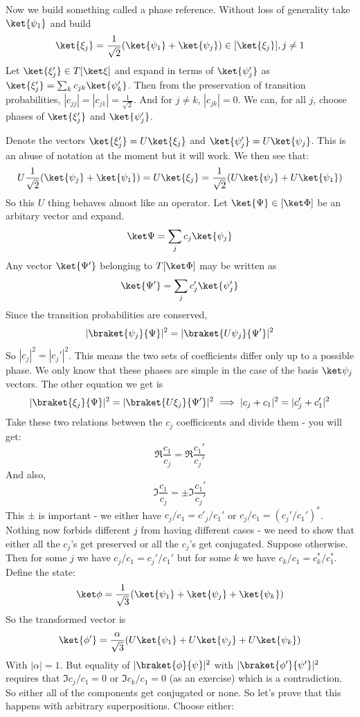 \documentclass{article}
\begin{document}
Now we build something called a phase reference. Without loss of generality take $\ket{\psi_1}$ and build 
\[\ket{\xi_j} = \frac{1}{\sqrt{2}}(\ket{\psi_1} + \ket{\psi_j}) \in [\ket{\xi_j}], j \neq 1\]
Let $\ket{\xi_j'} \in T[\ket\xi]$ and expand in terms of $\ket{\psi_j'}$ as $\ket{\xi_j'} = \sum_k c_{jk}\ket{\psi'_k}$. Then from the preservation of transition probabilities, $|c_{jj}|=|c_{j1}| = \frac{1}{\sqrt{2}}$. And for $j\neq k$, $|c_{jk}|=0$. We can, for all $j$, choose phases of $\ket{\xi_j'}$ and $\ket{\psi_j'}$.

Denote the vectors $\ket{\xi_j'} = U\ket{\xi_j}$ and $\ket{\psi_j'} = U\ket{\psi_j}$. This is an abuse of notation at the moment but it will work. We then see that:
\[U\frac{1}{\sqrt{2}}(\ket{\psi_j}+\ket{\psi_1}) = U\ket{\xi_j} = \frac{1}{\sqrt{2}}(U\ket{\psi_j}+U\ket{\psi_1})\]
So this $U$ thing behaves almost like an operator. Let $\ket{\Psi} \in [\ket\Phi]$ be an arbitary vector and expand.
\[\ket\Psi = \sum_j c_j \ket{\psi_j}\]
Any vector $\ket{\Psi'}$ belonging to $T[\ket\Phi]$ may be written as
\[\ket{\Psi'} = \sum_j c_j' \ket{\psi_j'}\]
Since the transition probabilities are conserved,
\[|\braket{\psi_j}{\Psi}|^2 = |\braket{U\psi_j}{\Psi'}|^2\]
So $|c_j|^2 = |c_j'|^2$. This means the two sets of coefficients differ only up to a possible phase. We only know that these phases are simple in the case of the basis $\ket\psi_j$ vectors. The other equation we get is
\[|\braket{\xi_j}{\Psi}|^2 = |\braket{U\xi_j}{\Psi'}|^2 \implies |c_j+c_1|^2 = |c_j'+c_1'|^2\]
Take these two relations between the $c_j$ coefficicents and divide them - you will get:
\[\Re\frac{c_1}{c_j} = \Re \frac{c_1'}{c_j'}\]
And also,
\[\Im\frac{c_1}{c_j} = \pm \Im \frac{c_1'}{c_j'}\]
This $\pm$ is important - we either have $c_j/c_1 = c'_j/c_1'$ or $c_j/c_1 = (c_j'/c_1')^*$. Nothing now forbids different $j$ from having different cases - we need to show that either all the $c_j$'s get preserved or all the $c_j$'s get conjugated. Suppose otherwise. Then for some $j$ we have $c_j/c_1 = c_j'/c_1'$ but for some $k$ we have $c_k/c_1 = c_k^*/c_1^*$. Define the state:
\[\ket\phi = \frac{1}{\sqrt 3} (\ket{\psi_1} + \ket{\psi_j} + \ket{\psi_k})\]
So the transformed vector is 
\[\ket{\phi'} = \frac{\alpha}{\sqrt 3} (U\ket{\psi_1} + U\ket{\psi_j} + U\ket{\psi_k})\]
With $|\alpha| = 1$. But equality of $|\braket{\phi}{\psi}|^2$ with $|\braket{\phi'}{\psi'}|^2$ requires that $\Im c_j/c_1 = 0 $ or $\Im c_k/c_1 = 0$ (as an exercise) which is a contradiction. So either all of the components get conjugated or none. So let's prove that this happens with arbitrary superpositions. Choose either:
\end{document}
